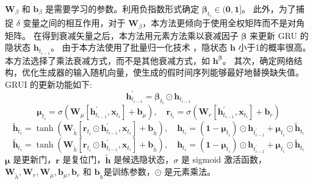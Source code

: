 $\boldsymbol{W}_\beta$ 和 $\boldsymbol{b}_\beta$ 是需要学习的参数。利用负指数形式确定 $\boldsymbol{\beta}_{t_i} \in(\mathbf{0}, \mathbf{1}]$。
此外，为了捕捉 $\delta$ 变量之间的相互作用，对于 $\boldsymbol{W}_\beta$，本方法更倾向于使用全权矩阵而不是对角矩阵。
在得到衰减矢量之后，本方法用元素方法乘以衰减因子 $\boldsymbol{\beta}$ 来更新 GRU 的隐状态 $\boldsymbol{h}_{t_{i-1}}$。
由于本方法使用了批量归一化技术 ，隐状态 $\boldsymbol{h}$ 小于1的概率很高。本方法选择了乘法衰减方式，而不是其他衰减方式，如  $\boldsymbol{h}^{\boldsymbol{\beta}}$。
其次，确定网络结构，优化生成器的输入随机向量，使生成的假时间序列能够最好地替换缺失值。GRUI 的更新功能如下:    
\begin{equation}
    \boldsymbol{h}_{t_{i-1}}^{\prime}=\boldsymbol{\beta}_{t_i} \odot \boldsymbol{h}_{t_{i-1}}
    \end{equation}
\begin{equation}
    \boldsymbol{\mu}_{t_i}=\sigma\left(\boldsymbol{W}_\mu\left[\boldsymbol{h}_{t_{i-1}}^{\prime}, \boldsymbol{x}_{t_i}\right]+\boldsymbol{b}_\mu\right), \quad \boldsymbol{r}_{t_i}=\sigma\left(\boldsymbol{W}_r\left[\boldsymbol{h}_{t_{i-1}}^{\prime}, \boldsymbol{x}_{t_i}\right]+\boldsymbol{b}_r\right)
    \end{equation}
\begin{equation}
    \tilde{\boldsymbol{h}}_{t_i}=\tanh \left(\boldsymbol{W}_{\tilde{h}}\left[\boldsymbol{r}_{t_i} \odot \boldsymbol{h}_{t_{i-1}}^{\prime}, \boldsymbol{x}_{t_i}\right]+\boldsymbol{b}_{\tilde{h}}\right), \quad \boldsymbol{h}_{t_i}=\left(\mathbf{1}-\boldsymbol{\mu}_{t_i}\right) \odot \boldsymbol{h}_{t_{i-1}^{\prime}}+\boldsymbol{\mu}_{t_i} \odot \tilde{\boldsymbol{h}}_{t_i}
    \end{equation}
\begin{equation}
\tilde{\boldsymbol{h}}_{t_i}=\tanh \left(\boldsymbol{W}_{\tilde{h}}\left[\boldsymbol{r}_{t_i} \odot \boldsymbol{h}_{t_{i-1}}^{\prime}, \boldsymbol{x}_{t_i}\right]+\boldsymbol{b}_{\tilde{h}}\right), \quad \boldsymbol{h}_{t_i}=\left(\mathbf{1}-\boldsymbol{\mu}_{t_i}\right) \odot \boldsymbol{h}_{t_{i-1}^{\prime}}+\boldsymbol{\mu}_{t_i} \odot \tilde{\boldsymbol{h}}_{t_i}
\end{equation}
$\boldsymbol{\mu}$ 是更新门，$\boldsymbol{r}$ 是复位门，$\tilde{\boldsymbol{h}}$ 是候选隐状态，$\sigma$ 是 sigmoid 激活函数，$\boldsymbol{W}_{\tilde{h}}, \boldsymbol{W}_r, \boldsymbol{W}_\mu, \boldsymbol{b}_\mu, \boldsymbol{b}_r$ 
和 $\boldsymbol{b}_{\tilde{h}}$是训练参数，$\odot$ 是元素乘法。

